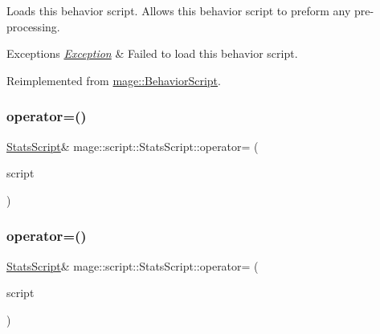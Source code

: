 Loads this behavior script. Allows this behavior script to preform any pre-\/processing.


\begin{DoxyExceptions}{Exceptions}
{\em \hyperlink{classmage_1_1_exception}{Exception}} & Failed to load this behavior script. \\
\hline
\end{DoxyExceptions}


Reimplemented from \hyperlink{classmage_1_1_behavior_script_a06521eef472f2d878a9f652b95b723a8}{mage\+::\+Behavior\+Script}.

\hypertarget{classmage_1_1script_1_1_stats_script_ad33bbb402575b5abcb2639817d27b180}{}\label{classmage_1_1script_1_1_stats_script_ad33bbb402575b5abcb2639817d27b180} 
\subsubsection{\texorpdfstring{operator=()}{operator=()}\hspace{0.1cm}{\footnotesize\ttfamily [1/2]}}
{\footnotesize\ttfamily \hyperlink{classmage_1_1script_1_1_stats_script}{Stats\+Script}\& mage\+::script\+::\+Stats\+Script\+::operator= (\begin{DoxyParamCaption}\item[{const \hyperlink{classmage_1_1script_1_1_stats_script}{Stats\+Script} \&}]{script }\end{DoxyParamCaption})\hspace{0.3cm}{\ttfamily [delete]}}

\hypertarget{classmage_1_1script_1_1_stats_script_a5eecd80eef17414d566c7d7c77b3dbce}{}\label{classmage_1_1script_1_1_stats_script_a5eecd80eef17414d566c7d7c77b3dbce} 
\subsubsection{\texorpdfstring{operator=()}{operator=()}\hspace{0.1cm}{\footnotesize\ttfamily [2/2]}}
{\footnotesize\ttfamily \hyperlink{classmage_1_1script_1_1_stats_script}{Stats\+Script}\& mage\+::script\+::\+Stats\+Script\+::operator= (\begin{DoxyParamCaption}\item[{\hyperlink{classmage_1_1script_1_1_stats_script}{Stats\+Script} \&\&}]{script }\end{DoxyParamCaption})\hspace{0.3cm}{\ttfamily [delete]}}


